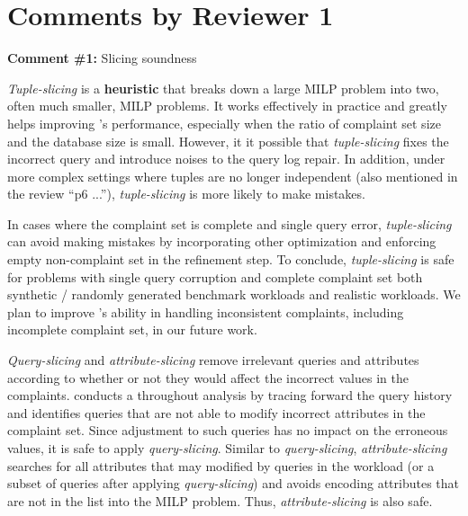 
\section*{Comments by Reviewer 1}

\noindent
\textbf{Comment \#1:} Slicing soundness
\begin{quote}
\end{quote}

\emph{Tuple-slicing} is a \textbf{heuristic} that breaks down a large MILP problem 
into two, often much smaller, MILP problems. It works effectively in practice and 
greatly helps improving \sys's performance, especially when the ratio of complaint 
set size and the database size is small. However, it it possible that \emph{tuple-slicing} 
fixes the incorrect query and introduce noises to the query log repair. In addition, 
under more complex settings where tuples are no longer independent 
(also mentioned in the review ``p6 ...''), \emph{tuple-slicing} 
is more likely to make mistakes. 

In cases where the complaint set is complete and single query error,
 \emph{tuple-slicing} can avoid making mistakes by incorporating other optimization and
  enforcing empty non-complaint set
in the refinement step. 
To conclude, \emph{tuple-slicing} is safe for problems with single query corruption and complete complaint set both synthetic / randomly
generated benchmark workloads and realistic workloads. We plan to improve \sys's ability in handling 
inconsistent complaints, including incomplete complaint set, in our future work.

\emph{Query-slicing} and \emph{attribute-slicing} remove irrelevant queries and attributes 
according to whether or not they would affect the incorrect values in the complaints. 
\sys conducts a throughout analysis by tracing forward the query history and identifies
queries that are not able to modify incorrect attributes in the complaint set. Since adjustment
to such queries has no impact on the erroneous values, it is safe to apply \emph{query-slicing}. 
Similar to \emph{query-slicing}, \emph{attribute-slicing} searches for all attributes that may
modified by queries in the workload (or a subset of queries after applying \emph{query-slicing}) and
avoids encoding attributes that are not in the list into the MILP problem. Thus, \emph{attribute-slicing}
is also safe. 


